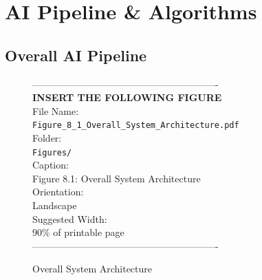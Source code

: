 \chapter{AI Pipeline \& Algorithms}

\section{Overall AI Pipeline}
\begin{figure}[htbp]
\begin{center}
----------------------------------------------------------\\
\vspace{0.5em}
\textbf{INSERT THE FOLLOWING FIGURE}\\
\vspace{1em}
File Name:\\
\texttt{Figure\_8\_1\_Overall\_System\_Architecture.pdf}\\
\vspace{1em}
Folder:\\
\texttt{Figures/}\\
\vspace{1em}
Caption:\\
Figure 8.1: Overall System Architecture\\
\vspace{1em}
Orientation:\\
Landscape\\
\vspace{1em}
Suggested Width:\\
90\% of printable page\\
\vspace{3cm}
----------------------------------------------------------
\end{center}
\caption{Overall System Architecture}
\label{fig:diag_1}
\end{figure}
\vspace{1em}
